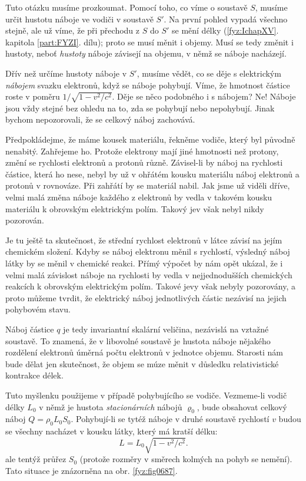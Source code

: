     Tuto otázku musíme prozkoumat. Pomocí toho, co víme o soustavě \(S\), musíme určit hustotu
    náboje ve vodiči v soustavě \(S'\). Na první pohled vypadá všechno stejně, ale už víme, že při
    přechodu z \(S\) do \(S'\) se mění délky (\ref{fyz:IchapXV}. kapitola \ref{part:FYZI}. dílu);
    proto se musí měnit i objemy. Musí se tedy změnit i hustoty, neboť \emph{hustoty} náboje
    závisejí na objemu, v němž se náboje nacházejí.

    Dřív než určíme hustoty náboje v \(S'\), musíme vědět, co se děje s elektrickým \emph{nábojem}
    svazku elektronů, když se náboje pohybují. Víme, že hmotnost částice roste v poměru \(1/\sqrt{1
    - v^2/c^2}\).  Děje se něco podobného i s nábojem? Ne! Náboje jsou vždy stejné bez ohledu na to,
    zda se pohybují nebo nepohybují. Jinak bychom nepozorovali, že se celkový náboj zachovává.

    Předpokládejme, že máme kousek materiálu, řekněme vodiče, který byl původně nenabitý. 
    Zahřejeme ho. Protože elektrony mají jiné hmotnosti než protony, změní se rychlosti elektronů a
    protonů různě. Závisel-li by náboj na rychlosti částice, která ho nese, nebyl by už v ohřátém
    kousku materiálu náboj elektronů a protonů v rovnováze. Při zahřátí by se materiál nabil. Jak
    jsme už viděli dříve, velmi malá změna náboje každého z elektronů by vedla v takovém kousku
    materiálu k obrovským elektrickým polím. Takový jev však nebyl nikdy pozorován.

    Je tu ještě ta skutečnost, že střední rychlost elektronů v látce závisí na jejím chemickém
    složení. Kdyby se náboj elektronu měnil s rychlostí, výsledný náboj látky by se měnil v chemické
    reakci. Přímý výpočet by nám opět ukázal, že i velmi malá závislost náboje na rychlosti by vedla
    v nejjednodušších chemických reakcích k obrovským elektrickým polím. Takové jevy však nebyly
    pozorovány, a proto můžeme tvrdit, že elektrický náboj jednotlivých částic nezávisí na jejich
    pohybovém stavu.

    Náboj částice \(q\) je tedy invariantní skalární veličina, nezávislá na vztažné soustavě. To
    znamená, že v libovolné soustavě je hustota náboje nějakého rozdělení elektronů úměrná počtu
    elektronů v jednotce objemu. Starosti nám bude dělat jen skutečnost, že objem se múze měnit v
    důsledku relativistické kontrakce délek.

    Tuto myšlenku použijeme v případě pohybujícího se vodiče. Vezmeme-li vodič délky \(L_0\) v němž
    je hustota \emph{stacionárních} nábojů \(\varrho_0\), bude obsahovat celkový náboj
    \(Q=ρ_0L_0S_0\). Pohybují-li se tytéž náboje v druhé soustavě rychlostí \(v\) budou se všechny
    nacházet v kousku látky, který má kratší délku:
    \begin{equation}\label{fyz:eq811}
      L=L_0\sqrt{1−v^2/c^2}.
    \end{equation}
    ale tentýž průřez \(S_0\) (protože rozměry v směrech kolmých na pohyb se nemění). Tato situace je
    znázorněna na obr. \ref{fyz:fig0687}.

